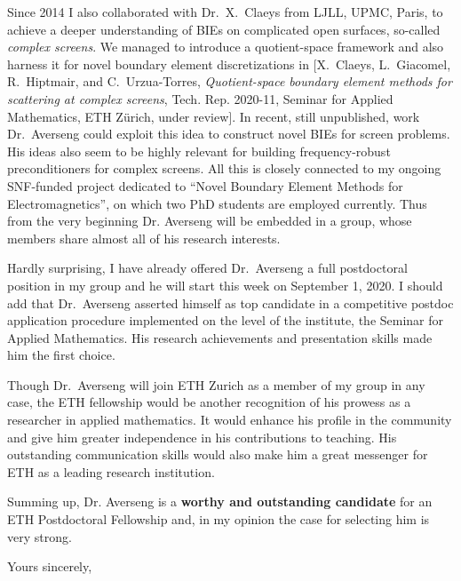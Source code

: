 \documentclass[english]{ethbrief3}
\begin{document}
Since 2014 I also collaborated with Dr.~X.~Claeys from LJLL, UPMC, Paris, to achieve a
deeper understanding of BIEs on complicated open surfaces, so-called \emph{complex
  screens}. We managed to introduce a quotient-space framework and also harness it for
novel boundary element discretizations in $[${\sc X.~Claeys, L.~Giacomel, R.~Hiptmair, and
  C.~Urzua-Torres}, {\em Quotient-space boundary element methods for scattering at complex
  screens}, Tech. Rep. 2020-11, Seminar for Applied Mathematics, ETH Z{\"u}rich, under
review$]$. In recent, still unpublished, work Dr.~Averseng could exploit this idea to
construct novel BIEs for screen problems. His ideas also seem to be highly relevant for
building frequency-robust preconditioners for complex screens. All this is closely
connected to my ongoing SNF-funded project dedicated to ``Novel Boundary Element Methods
for Electromagnetics'', on which two PhD students are employed currently. Thus from the
very beginning Dr. Averseng will be embedded in a group, whose members share almost all of
his research interests.

Hardly surprising, I have already offered Dr.~Averseng a full postdoctoral position in my
group and he will start this week on September 1, 2020. I should add that Dr.~Averseng
asserted himself as top candidate in a competitive postdoc application procedure
implemented on the level of the institute, the Seminar for Applied Mathematics. His
research achievements and presentation skills made him the first choice. 

Though Dr.~Averseng will join ETH Zurich as a member of my group in any case,
the ETH fellowship would be another recognition of his prowess as a researcher in applied
mathematics. It would enhance his profile in the community and give him greater
independence in his contributions to teaching. His outstanding communication skills would also
make him a great messenger for ETH as a leading research institution.

Summing up, Dr. Averseng is a \textbf{worthy and outstanding candidate} for an ETH
Postdoctoral Fellowship and, in my opinion the case for selecting him is very strong. 
	
   \closing{Yours sincerely,}

\end{document}
